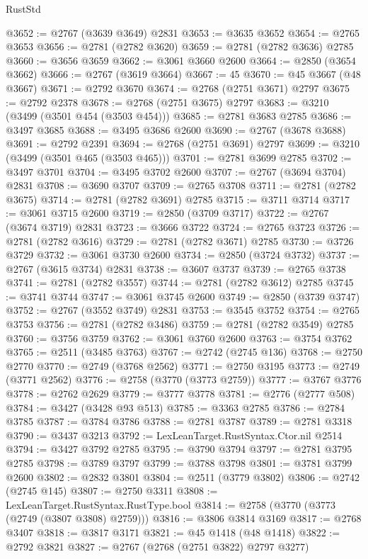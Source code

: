 \begin{lexlean}{RustStd}
\begin{coremodule}
@3652 := @2767 (@3639 @3649) @2831
@3653 := @3635 @3652
@3654 := @2765 @3653
@3656 := @2781 (@2782 @3620)
@3659 := @2781 (@2782 @3636) @2785
@3660 := @3656 @3659
@3662 := @3061 @3660 @2600
@3664 := @2850 (@3654 @3662)
@3666 := @2767 (@3619 @3664)
@3667 := 45
@3670 := @45 @3667 (@48 @3667)
@3671 := @2792 @3670
@3674 := @2768 (@2751 @3671) @2797
@3675 := @2792 @2378
@3678 := @2768 (@2751 @3675) @2797
@3683 := @3210 (@3499 (@3501 @454 (@3503 @454)))
@3685 := @2781 @3683 @2785
@3686 := @3497 @3685
@3688 := @3495 @3686 @2600
@3690 := @2767 (@3678 @3688)
@3691 := @2792 @2391
@3694 := @2768 (@2751 @3691) @2797
@3699 := @3210 (@3499 (@3501 @465 (@3503 @465)))
@3701 := @2781 @3699 @2785
@3702 := @3497 @3701
@3704 := @3495 @3702 @2600
@3707 := @2767 (@3694 @3704) @2831
@3708 := @3690 @3707
@3709 := @2765 @3708
@3711 := @2781 (@2782 @3675)
@3714 := @2781 (@2782 @3691) @2785
@3715 := @3711 @3714
@3717 := @3061 @3715 @2600
@3719 := @2850 (@3709 @3717)
@3722 := @2767 (@3674 @3719) @2831
@3723 := @3666 @3722
@3724 := @2765 @3723
@3726 := @2781 (@2782 @3616)
@3729 := @2781 (@2782 @3671) @2785
@3730 := @3726 @3729
@3732 := @3061 @3730 @2600
@3734 := @2850 (@3724 @3732)
@3737 := @2767 (@3615 @3734) @2831
@3738 := @3607 @3737
@3739 := @2765 @3738
@3741 := @2781 (@2782 @3557)
@3744 := @2781 (@2782 @3612) @2785
@3745 := @3741 @3744
@3747 := @3061 @3745 @2600
@3749 := @2850 (@3739 @3747)
@3752 := @2767 (@3552 @3749) @2831
@3753 := @3545 @3752
@3754 := @2765 @3753
@3756 := @2781 (@2782 @3486)
@3759 := @2781 (@2782 @3549) @2785
@3760 := @3756 @3759
@3762 := @3061 @3760 @2600
@3763 := @3754 @3762
@3765 := @2511 (@3485 @3763)
@3767 := @2742 (@2745 @136)
@3768 := @2750 @2770
@3770 := @2749 (@3768 @2562)
@3771 := @2750 @3195
@3773 := @2749 (@3771 @2562)
@3776 := @2758 (@3770 (@3773 @2759))
@3777 := @3767 @3776
@3778 := @2762 @2629
@3779 := @3777 @3778
@3781 := @2776 (@2777 @508)
@3784 := @3427 (@3428 @93 @513)
@3785 := @3363 @2785
@3786 := @2784 @3785
@3787 := @3784 @3786
@3788 := @2781 @3787
@3789 := @2781 @3318
@3790 := @3437 @3213
@3792 := LexLeanTarget.RustSyntax.Ctor.nil @2514
@3794 := @3427 @3792 @2785
@3795 := @3790 @3794
@3797 := @2781 @3795 @2785
@3798 := @3789 @3797
@3799 := @3788 @3798
@3801 := @3781 @3799 @2600
@3802 := @2832 @3801
@3804 := @2511 (@3779 @3802)
@3806 := @2742 (@2745 @145)
@3807 := @2750 @3311
@3808 := LexLeanTarget.RustSyntax.RustType.bool
@3814 := @2758 (@3770 (@3773 (@2749 (@3807 @3808) @2759)))
@3816 := @3806 @3814 @3169
@3817 := @2768 @3407
@3818 := @3817 @3171
@3821 := @45 @1418 (@48 @1418)
@3822 := @2792 @3821
@3827 := @2767 (@2768 (@2751 @3822) @2797 @3277)

\end{coremodule}
\end{lexlean}
